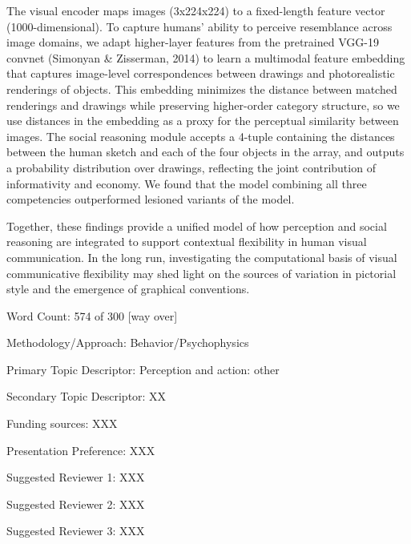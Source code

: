 \documentclass{article}
\begin{document}
The visual encoder maps images (3x224x224) to a fixed-length feature vector (1000-dimensional). To capture humans' ability to perceive resemblance across image domains, we adapt higher-layer features from the pretrained VGG-19 convnet (Simonyan \& Zisserman, 2014) to learn a multimodal feature embedding that captures image-level correspondences between drawings and photorealistic renderings of objects. This embedding minimizes the distance between matched renderings and drawings while preserving higher-order category structure, so we use distances in the embedding as a proxy for the perceptual similarity between images. The social reasoning module accepts a 4-tuple containing the distances between the human sketch and each of the four objects in the array, and outputs a probability distribution over drawings, reflecting the joint contribution of informativity and economy. We found that the model combining all three competencies outperformed lesioned variants of the model. 

Together, these findings provide a unified model of how perception and social reasoning are integrated to support contextual flexibility in human visual communication. In the long run, investigating the computational basis of visual communicative flexibility may shed light on the sources of variation in pictorial style and the emergence of graphical conventions.


\vspace{3mm}

\begin{description}  
\item Word Count: 574 of 300 [way over]
\item Methodology/Approach: Behavior/Psychophysics
\item Primary Topic Descriptor: Perception and action: other
\item Secondary Topic Descriptor: XX
\item Funding sources: XXX
\item Presentation Preference: XXX
\item Suggested Reviewer 1: XXX
\item Suggested Reviewer 2: XXX
\item Suggested Reviewer 3: XXX
\end{description}
\end{document}
